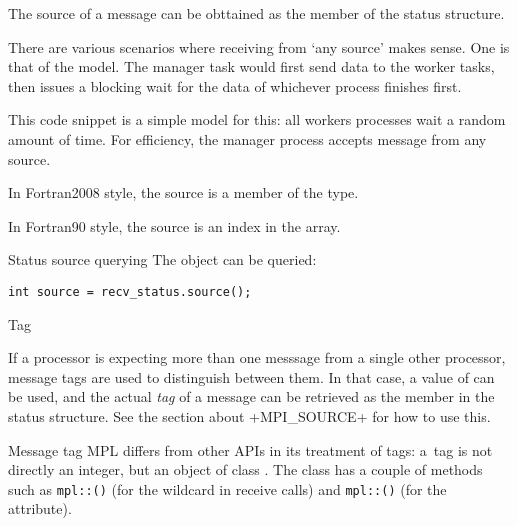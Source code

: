 The source of a message can be obttained as the
member of the status structure.

There are various scenarios where receiving from `any source' makes sense.
One is that of the  model. The manager task would first send
data to the worker tasks, then issues a blocking wait for the data of whichever process
finishes first.

This code snippet is a simple model for this: all workers processes wait
a random amount of time. For efficiency, the manager process accepts message from any source.


In Fortran2008 style, the source is a member of the  type.


In Fortran90 style, the source is an index in the  array.


\begin{mplnote}{Status source querying}
The  object can be queried:
\begin{lstlisting}
int source = recv_status.source();
\end{lstlisting}
\end{mplnote}

 {Tag}

If a processor is expecting more than one messsage from a single other processor,
message tags are used to distinguish between them. In that case,
a value of  can be used, and the actual
\emph{tag}
of a message can be retrieved as the
%
%
member in the status structure. See the section about \clstinline+MPI_SOURCE+
for how to use this.

\begin{mplnote}{Message tag}
  \ac{MPL} differs from other \acp{API} in its treatment of tags:
  a~tag is not directly an integer, but an object of class .
  The  class has a couple of methods such as
  \lstinline+mpl::+\lstinline+()+
  (for the  wildcard in receive calls)
  and
  \lstinline+mpl::+\lstinline+()+
  (for the  attribute).
\end{mplnote}

